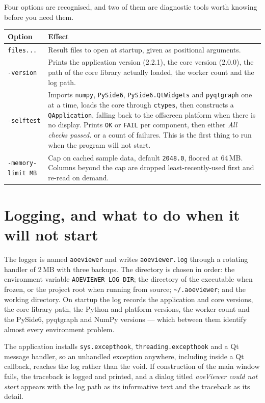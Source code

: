 \documentclass[11pt,a4paper,oneside]{report}
\newcommand{\appver}{2.2.1}
\newcommand{\code}[1]{\texttt{#1}}
\begin{document}
Four options are recognised, and two of them are diagnostic tools worth knowing
before you need them.

\begin{center}
\small
\begin{tabular}{@{}p{}p{}@{}}
\toprule
\textbf{Option} & \textbf{Effect} \\
\midrule
\code{files...} & Result files to open at startup, given as positional arguments. \\
\addlinespace
\code{-version} & Prints the application version (\appver), the core version
  (2.0.0), the path of the core library actually loaded, the worker count and
  the log path. \\
\addlinespace
\code{-selftest} & Imports \code{numpy}, \code{PySide6},
  \code{PySide6.QtWidgets} and \code{pyqtgraph} one at a time, loads the core
  through \code{ctypes}, then constructs a \code{QApplication}, falling back to
  the offscreen platform when there is no display. Prints \code{OK} or
  \code{FAIL} per component, then either \emph{All checks passed.} or a count of
  failures. This is the first thing to run when the program will not start. \\
\addlinespace
\code{-memory-limit MB} & Cap on cached sample data, default \code{2048.0},
  floored at 64\,MB. Columns beyond the cap are dropped least-recently-used
  first and re-read on demand. \\
\bottomrule
\end{tabular}
\end{center}

\section{Logging, and what to do when it will not start}

The logger is named \code{aoeviewer} and writes \code{aoeviewer.log} through a
rotating handler of 2\,MB with three backups. The directory is chosen in order:
the environment variable \code{AOEVIEWER\_LOG\_DIR}; the directory of the
executable when frozen, or the project root when running from source;
\code{\textasciitilde/.aoeviewer}; and the working directory. On startup the log
records the application and core versions, the core library path, the Python and
platform versions, the worker count and the PySide6, pyqtgraph and NumPy
versions --- which between them identify almost every environment problem.

The application installs \code{sys.excepthook},
\code{threading.excepthook} and a Qt message handler, so an unhandled exception
anywhere, including inside a Qt callback, reaches the log rather than the void.
If construction of the main window fails, the traceback is logged and printed,
and a dialog titled \emph{aoeViewer could not start} appears with the log path as
its informative text and the traceback as its detail.
\end{document}
